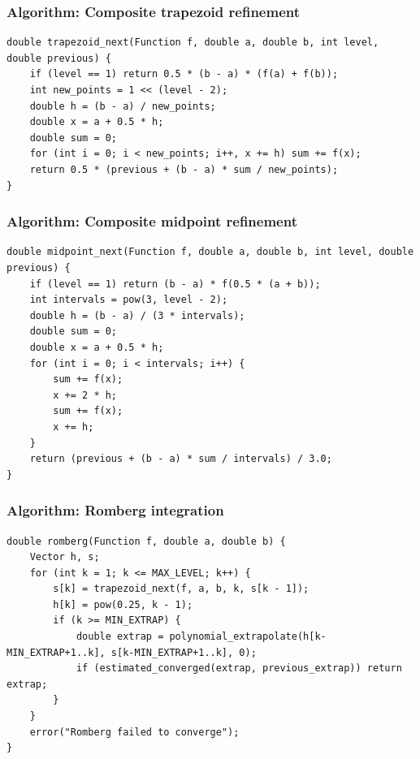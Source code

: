 \documentclass[11pt]{article}
\begin{document}
\subsubsection{Algorithm: Composite trapezoid refinement}\label{algorithm-composite-trapezoid-refinement}

\begin{verbatim}
double trapezoid_next(Function f, double a, double b, int level, double previous) {
    if (level == 1) return 0.5 * (b - a) * (f(a) + f(b));
    int new_points = 1 << (level - 2);
    double h = (b - a) / new_points;
    double x = a + 0.5 * h;
    double sum = 0;
    for (int i = 0; i < new_points; i++, x += h) sum += f(x);
    return 0.5 * (previous + (b - a) * sum / new_points);
}
\end{verbatim}

\subsubsection{Algorithm: Composite midpoint refinement}\label{algorithm-composite-midpoint-refinement}

\begin{verbatim}
double midpoint_next(Function f, double a, double b, int level, double previous) {
    if (level == 1) return (b - a) * f(0.5 * (a + b));
    int intervals = pow(3, level - 2);
    double h = (b - a) / (3 * intervals);
    double sum = 0;
    double x = a + 0.5 * h;
    for (int i = 0; i < intervals; i++) {
        sum += f(x);
        x += 2 * h;
        sum += f(x);
        x += h;
    }
    return (previous + (b - a) * sum / intervals) / 3.0;
}
\end{verbatim}

\subsubsection{Algorithm: Romberg integration}\label{algorithm-romberg-integration}

\begin{verbatim}
double romberg(Function f, double a, double b) {
    Vector h, s;
    for (int k = 1; k <= MAX_LEVEL; k++) {
        s[k] = trapezoid_next(f, a, b, k, s[k - 1]);
        h[k] = pow(0.25, k - 1);
        if (k >= MIN_EXTRAP) {
            double extrap = polynomial_extrapolate(h[k-MIN_EXTRAP+1..k], s[k-MIN_EXTRAP+1..k], 0);
            if (estimated_converged(extrap, previous_extrap)) return extrap;
        }
    }
    error("Romberg failed to converge");
}
\end{verbatim}
\end{document}
